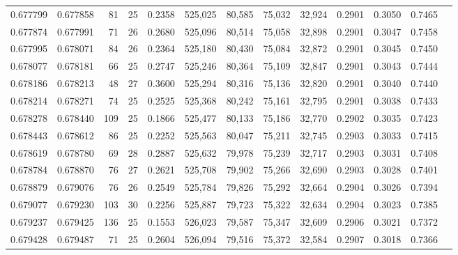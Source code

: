 \begin{tabular}{rrrrrrrrrrrrr}
0.677799 & 0.677858 &    81 &  25 &                                     0.2358 & 525,025 &  80,585 &  75,032 &  32,924 & 0.2901 & 0.3050 & 0.7465 \\
0.677874 & 0.677991 &    71 &  26 &                                     0.2680 & 525,096 &  80,514 &  75,058 &  32,898 & 0.2901 & 0.3047 & 0.7458 \\
0.677995 & 0.678071 &    84 &  26 &                                     0.2364 & 525,180 &  80,430 &  75,084 &  32,872 & 0.2901 & 0.3045 & 0.7450 \\
0.678077 & 0.678181 &    66 &  25 &                                     0.2747 & 525,246 &  80,364 &  75,109 &  32,847 & 0.2901 & 0.3043 & 0.7444 \\
0.678186 & 0.678213 &    48 &  27 &                                     0.3600 & 525,294 &  80,316 &  75,136 &  32,820 & 0.2901 & 0.3040 & 0.7440 \\
0.678214 & 0.678271 &    74 &  25 &                                     0.2525 & 525,368 &  80,242 &  75,161 &  32,795 & 0.2901 & 0.3038 & 0.7433 \\
0.678278 & 0.678440 &   109 &  25 &                                     0.1866 & 525,477 &  80,133 &  75,186 &  32,770 & 0.2902 & 0.3035 & 0.7423 \\
0.678443 & 0.678612 &    86 &  25 &                                     0.2252 & 525,563 &  80,047 &  75,211 &  32,745 & 0.2903 & 0.3033 & 0.7415 \\
0.678619 & 0.678780 &    69 &  28 &                                     0.2887 & 525,632 &  79,978 &  75,239 &  32,717 & 0.2903 & 0.3031 & 0.7408 \\
0.678784 & 0.678870 &    76 &  27 &                                     0.2621 & 525,708 &  79,902 &  75,266 &  32,690 & 0.2903 & 0.3028 & 0.7401 \\
0.678879 & 0.679076 &    76 &  26 &                                     0.2549 & 525,784 &  79,826 &  75,292 &  32,664 & 0.2904 & 0.3026 & 0.7394 \\
0.679077 & 0.679230 &   103 &  30 &                                     0.2256 & 525,887 &  79,723 &  75,322 &  32,634 & 0.2904 & 0.3023 & 0.7385 \\
0.679237 & 0.679425 &   136 &  25 &                                     0.1553 & 526,023 &  79,587 &  75,347 &  32,609 & 0.2906 & 0.3021 & 0.7372 \\
0.679428 & 0.679487 &    71 &  25 &                                     0.2604 & 526,094 &  79,516 &  75,372 &  32,584 & 0.2907 & 0.3018 & 0.7366 \\

\end{tabular}
